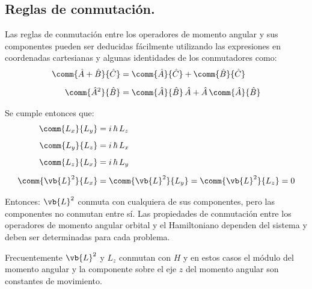 
\subsection{Reglas de conmutación.}

Las reglas de conmutación entre los operadores de momento angular y sus componentes pueden ser deducidas fácilmente utilizando las expresiones en coordenadas cartesianas y algunas identidades de los conmutadores como:
\begin{align*}
\comm{\hat{A} + \hat{B}}{\hat{C}} &= \comm{\hat{A}}{\hat{C}} + \comm{\hat{B}}{\hat{C}} \\[0.5em]
\comm{\hat{A}^{2}}{\hat{B}} &= \comm{\hat{A}}{\hat{B}} \, \hat{A} + \hat{A} \, \comm{\hat{A}}{\hat{B}}
\end{align*}

Se cumple entonces que:
\begin{align}
\begin{aligned}
\comm{L_{x}}{L_{y}} &= i \, \hbar \, L_{z} \\[0.5em]
\comm{L_{y}}{L_{z}} &= i \, \hbar \, L_{x} \\[0.5em]
\comm{L_{z}}{L_{x}} &= i \, \hbar \, L_{y} \\[0.5em]
\comm{\vb{L}^{2}}{L_{x}} &= \comm{\vb{L}^{2}}{L_{y}} = \comm{\vb{L}^{2}}{L_{z}} = 0
\end{aligned}
\label{eq:ecuacion_01_07}
\end{align}

Entonces: $\vb{L}^{2}$ conmuta con cualquiera de sus componentes, pero las componentes no conmutan entre sí. Las propiedades de conmutación entre los operadores de momento angular orbital y el Hamiltoniano dependen del sistema y deben ser determinadas para cada problema.
\par
Frecuentemente $\vb{L}^{2}$ y $L_{z}$ conmutan con $H$ y en estos casos el módulo del momento angular y la componente sobre el eje $z$ del momento angular son constantes de movimiento.

